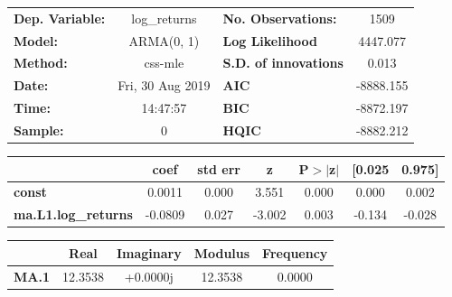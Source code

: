 \begin{center}
\begin{tabular}{lclc}
\toprule
\textbf{Dep. Variable:}     &        log\_returns       & \textbf{  No. Observations:  } &            1509            \\
\textbf{Model:}             &         ARMA(0, 1)        & \textbf{  Log Likelihood     } &          4447.077          \\
\textbf{Method:}            &          css-mle          & \textbf{  S.D. of innovations} &           0.013            \\
\textbf{Date:}              &      Fri, 30 Aug 2019     & \textbf{  AIC                } &         -8888.155          \\
\textbf{Time:}              &          14:47:57         & \textbf{  BIC                } &         -8872.197          \\
\textbf{Sample:}            &             0             & \textbf{  HQIC               } &         -8882.212          \\
\bottomrule
\end{tabular}
\begin{tabular}{lcccccc}
                            & \textbf{coef} & \textbf{std err} & \textbf{z} & \textbf{P$> |$z$|$} & \textbf{[0.025} & \textbf{0.975]}  \\
\midrule
\textbf{const}              &       0.0011  &        0.000     &     3.551  &         0.000        &        0.000    &        0.002     \\
\textbf{ma.L1.log\_returns} &      -0.0809  &        0.027     &    -3.002  &         0.003        &       -0.134    &       -0.028     \\
\bottomrule
\end{tabular}
\begin{tabular}{lcccc}
              & \textbf{            Real} & \textbf{         Imaginary} & \textbf{         Modulus} & \textbf{        Frequency}  \\
\midrule
\textbf{MA.1} &               12.3538     &                +0.0000j     &               12.3538     &                0.0000       \\
\bottomrule
\end{tabular}
\end{center}
